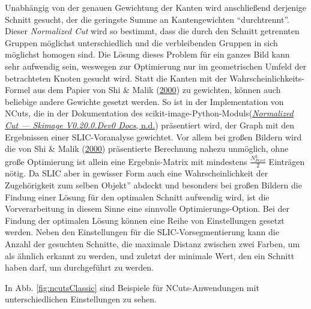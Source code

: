 \documentclass[
  12pt,
  openany]{book}
\begin{document}
Unabhängig von der genauen Gewichtung der Kanten wird anschließend derjenige Schnitt gesucht, der die geringste Summe an Kantengewichten ``durchtrennt''. Dieser \emph{Normalized Cut} wird so bestimmt, dass die durch den Schnitt getrennten Gruppen möglichst unterschiedlich und die verbleibenden Gruppen in sich möglichst homogen sind. Die Lösung dieses Problem für ein ganzes Bild kann sehr aufwendig sein, weswegen zur Optimierung nur im geometrischen Umfeld der betrachteten Knoten gesucht wird.
Statt die Kanten mit der Wahrscheinlichkeits-Formel aus dem Papier von Shi \& Malik (\protect\hyperlink{ref-shiNormalizedCutsImage2000}{2000}) zu gewichten, können auch beliebige andere Gewichte gesetzt werden. So ist in der Implementation von NCuts, die in der Dokumentation des scikit-image-Python-Moduls(\protect\hyperlink{ref-NormalizedCutSkimage}{\emph{Normalized {Cut} --- Skimage V0.20.0.Dev0 Docs}, n.d.}) präsentiert wird, der Graph mit den Ergebnissen einer SLIC-Voranalyse gewichtet. Vor allem bei großen Bildern wird die von Shi \& Malik (\protect\hyperlink{ref-shiNormalizedCutsImage2000}{2000}) präsentierte Berechnung nahezu unmöglich, ohne große Optimierung ist allein eine Ergebnis-Matrix mit mindestens \(\frac{N_{Pixel}^2}{2}\) Einträgen nötig.
Da SLIC aber in gewisser Form auch eine \glqq{}Wahrscheinlichkeit der Zugehörigkeit zum selben Objekt'' abdeckt und besonders bei großen Bildern die Findung einer Lösung für den optimalen Schnitt aufwendig wird, ist die Vorverarbeitung in diesem Sinne eine sinnvolle Optimierungs-Option.
Bei der Findung der optimalen Lösung können eine Reihe von Einstellungen gesetzt werden. Neben den Einstellungen für die SLIC-Vorsegmentierung kann die Anzahl der gesuchten Schnitte, die maximale Distanz zwischen zwei Farben, um als ähnlich erkannt zu werden, und zuletzt der minimale Wert, den ein Schnitt haben darf, um durchgeführt zu werden.

In Abb. \ref{fig:ncutsClassic} sind Beispiele für NCuts-Anwendungen mit unterschiedlichen Einstellungen zu sehen.
\end{document}
